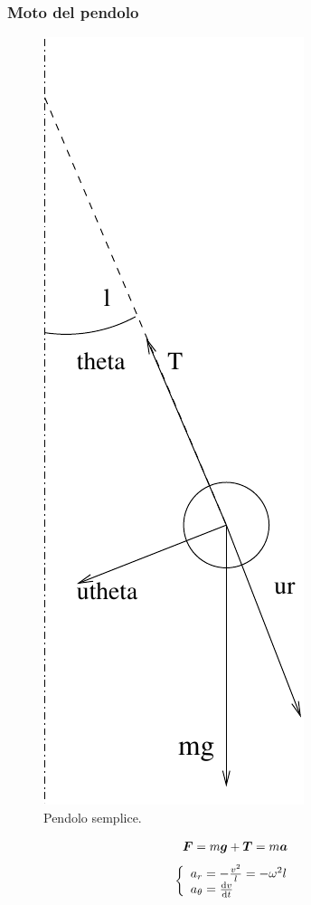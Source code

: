 \subsubsection{Moto del pendolo}
\begin{figure}[htbp]
  \centering
  \includegraphics[scale=0.4]{immagini/fisica1/pendolo_forza}
  \caption{Pendolo semplice.}
\end{figure}
\[\boldsymbol{F}=m\boldsymbol{g}+\boldsymbol{T}=m\boldsymbol{a}\]
\[\left\{
  \begin{array}{l}
    a_r=-\frac{v^2}{l}=-\omega^2 l \\
    a_\theta=\frac{\mathrm{d} v}{\mathrm{d} t}
  \end{array}
  \right.\]
